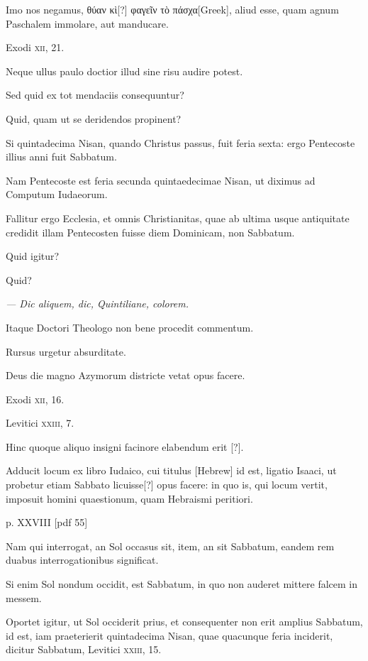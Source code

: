 \begin{parnumbers}
Imo nos negamus, \textgreek{θύαν κὶ[?] φαγεῖν τὸ πάσχα[Greek]},
 aliud esse, quam agnum Paschalem
immolare, aut manducare.

Exodi \textsc{xii}, 21.

Neque ullus paulo doctior illud sine risu audire potest.

Sed quid ex tot mendaciis consequuntur?

Quid, quam ut se deridendos propinent?

Si quintadecima Nisan, quando Christus passus, fuit feria sexta: ergo Pentecoste
illius anni fuit Sabbatum.

Nam Pentecoste est feria secunda
quintaedecimae Nisan, ut diximus ad Computum Iudaeorum.

Fallitur ergo Ecclesia, et omnis Christianitas, quae ab ultima usque
 antiquitate
credidit illam Pentecosten fuisse diem Dominicam, non
Sabbatum.

Quid igitur?

Quid?

\textit{— Dic aliquem, dic, Quintiliane, colorem.}

Itaque Doctori Theologo non bene procedit commentum.

Rursus urgetur absurditate.

Deus die magno Azymorum districte
vetat opus facere.

Exodi \textsc{xii}, 16.

Levitici \textsc{xxiii}, 7.

Hinc quoque
aliquo insigni facinore elabendum erit [?].

Adducit locum ex libro Iudaico,
cui titulus \texthebrew{[Hebrew]} id est, ligatio Isaaci, ut probetur etiam
Sabbato licuisse[?] opus facere: in quo is, qui locum vertit, imposuit homini
quaestionum, quam Hebraismi peritiori.

\clearpage
p. XXVIII [pdf 55]

Nam qui interrogat,
an Sol occasus sit, item, an sit Sabbatum, eandem rem duabus interrogationibus
significat.

Si enim Sol nondum occidit, est Sabbatum,
in quo non auderet mittere falcem in messem.

Oportet igitur,
ut Sol occiderit prius, et consequenter non erit amplius Sabbatum,
id est, iam praeterierit quintadecima Nisan, quae quacunque feria
inciderit, dicitur Sabbatum, Levitici \textsc{xxiii}, 15.


\end{parnumbers}
